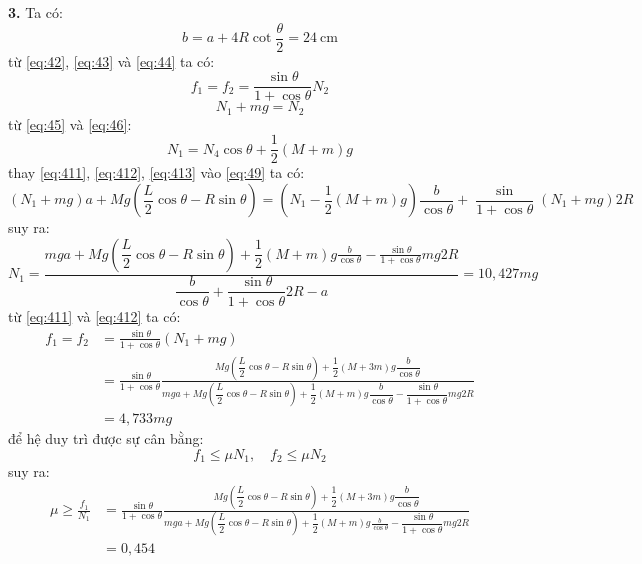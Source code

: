 \noindent\textbf{3.} Ta có:
\begin{equation}
  \label{eq:410}
  b=a+4R\cot\frac{\theta}{2}=\SI{24}{\centi\metre}
\end{equation}
từ \eqref{eq:42}, \eqref{eq:43} và \eqref{eq:44} ta có:
\begin{equation}
  \label{eq:411}
  f_{1}=f_{2}=\frac{\sin\theta}{1+\cos\theta}N_{2}
\end{equation}
\begin{equation}
  \label{eq:412}
  N_{1}+mg=N_{2}
\end{equation}
từ \eqref{eq:45} và \eqref{eq:46}:
\begin{equation}
  \label{eq:413}
  N_{1}=N_{4}\cos\theta+\frac{1}{2}(M+m)g
\end{equation}
thay \eqref{eq:411}, \eqref{eq:412}, \eqref{eq:413} vào \eqref{eq:49} ta có:
\begin{equation}
  \label{eq:414}
  (N_{1}+mg)a+Mg\left(\frac{L}{2}\cos\theta-R\sin\theta\right)=\left(N_{1}-\frac{1}{2}(M+m)g\right)\frac{b}{\cos\theta}+\frac{\sin}{1+\cos\theta}(N_{1}+mg)2R
\end{equation}
suy ra:
\begin{equation}
  \label{eq:415}
  N_{1}=\frac{mga+Mg\left(\dfrac{L}{2}\cos\theta-R\sin\theta\right)+\dfrac{1}{2}(M+m)g\frac{b}{\cos\theta}-\frac{\sin\theta}{1+\cos\theta}mg2R}{\dfrac{b}{\cos\theta}+\dfrac{\sin\theta}{1+\cos\theta}2R-a}=10,427mg
\end{equation}
từ \eqref{eq:411} và \eqref{eq:412} ta có:
\begin{align}
  \label{eq:416}
  f_{1}=f_{2} & =\frac{\sin\theta}{1+\cos\theta}(N_{1}+mg)                                                                                                                                                                                                                            \\\nonumber
              & =\frac{\sin\theta}{1+\cos\theta}\frac{Mg\left(\dfrac{L}{2}\cos\theta-R\sin\theta\right)+\dfrac{1}{2}(M+3m)g\dfrac{b}{\cos\theta}}{mga+Mg\left(\dfrac{L}{2}\cos\theta-R\sin\theta\right)+\dfrac{1}{2}(M+m)g\dfrac{b}{\cos\theta}-\dfrac{\sin\theta}{1+\cos\theta}mg2R} \\\nonumber
              & =4,733mg
\end{align}
để hệ duy trì được sự cân bằng:
\begin{equation}
  \label{eq:417}
  f_{1}\leqslant\mu N_{1},\quad f_{2}\leqslant\mu N_{2}
\end{equation}
suy ra:
\begin{align}
  \label{eq:418}
  \mu\geqslant\frac{f_{1}}{N_{1}} & =\frac{\sin\theta}{1+\cos\theta}\frac{Mg\left(\dfrac{L}{2}\cos\theta-R\sin\theta\right)+\dfrac{1}{2}(M+3m)g\dfrac{b}{\cos\theta}}{mga+Mg\left(\dfrac{L}{2}\cos\theta-R\sin\theta\right)+\dfrac{1}{2}(M+m)g\frac{b}{\cos\theta}-\dfrac{\sin\theta}{1+\cos\theta}mg2R} \\
  \nonumber                       & =0,454
\end{align}
